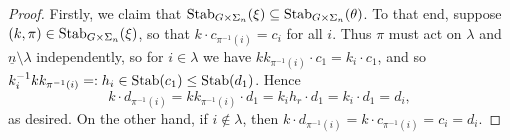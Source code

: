 \documentclass[a4paper,10pt
,draft
]{article}%
\renewcommand{\1}{\ensuremath{\mathbb{id}}}
\begin{document}
\begin{proof}
      Firstly, we claim that $\mathrm{Stab}_{G \times \Sigma_n}(\xi) \subseteq \mathrm{Stab}_{G \times \Sigma_n}(\theta)$.
      To that end, suppose $(k,\pi)\in \mathrm{Stab}_{G\times \Sigma_n}(\xi)$, so that $k \cdot c_{\pi^{-1}(i)} = c_i$ for all $i$.
      Thus $\pi$ must act on $\lambda$ and $\underline{n} \setminus \lambda$ independently,
      so for $i \in \lambda$ we have %
      $k k_{\pi^{-1}(i)} \cdot c_1 = k_i \cdot c_1$, and so
      $k_i^{-1} k k_{\pi^{-1}(i)} =:h_i \in \mathrm{Stab}(c_1) \leq \mathrm{Stab}(d_1)$. Hence 
      \begin{equation}
            \label{STAB_KT_EQ}
            k \cdot d_{\pi^{-1}(i)} = k k_{\pi^{-1}(i)} \cdot d_1 = k_i h_r \cdot d_1 = k_i \cdot d_1 = d_i,
      \end{equation}
      as desired.
      On the other hand, if $i \not \in \lambda$, then
      $k \cdot d_{\pi^{-1}(i)} = k \cdot c_{\pi^{-1}(i)} = c_i = d_i$.
      

\end{proof}
\end{document}
